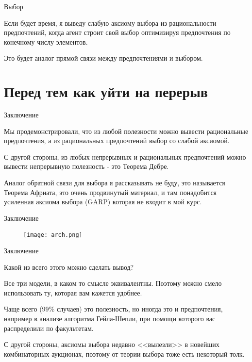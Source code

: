 \documentclass{beamer}
\begin{document}
\begin{frame}{Выбор}

Если будет время, я выведу слабую аксиому выбора из рациональности предпочтений, когда агент строит свой выбор оптимизируя предпочтения по конечному числу элементов. 

Это будет аналог прямой связи между предпочтениями и выбором.
%
%

\end{frame}

\section{Перед тем как уйти на перерыв}

\begin{frame}{Заключение}

Мы продемонстрировали, что из любой полезности можно вывести рациональные предпочтения, а из рациональных предпочтений выбор со слабой аксиомой.

С другой стороны, из любых непрерывных и рациональных предпочтений можно вывести непрерывную полезность - это Теорема Дебре.

Аналог обратной связи для выбора я рассказывать не буду, это называется \alert{Теорема Африата}, это очень продвинутый материал, и там понадобится усиленная аксиома выбора (GARP) которая не входит в мой курс. 

\end{frame}

\begin{frame}{Заключение}

\begin{figure}[hbt]
\centering
\texttt{[image: arch.png]}
\end{figure}

\end{frame}

\begin{frame}{Заключение}

Какой из всего этого можно сделать вывод?

Все три модели, в каком то смысле эквивалентны. Поэтому можно смело использовать ту, которая вам кажется удобнее. 

Чаще всего (99\% случаев) это полезность, но иногда это и предпочтения, например в анализе алгоритма Гейла-Шепли, при помощи которого вас распределили по факультетам. 

С другой стороны, аксиомы выбора недавно <<вылезли>> в новейших комбинаторных аукционах, поэтому от теории выбора тоже есть некоторый толк.

\end{frame}
\end{document}
